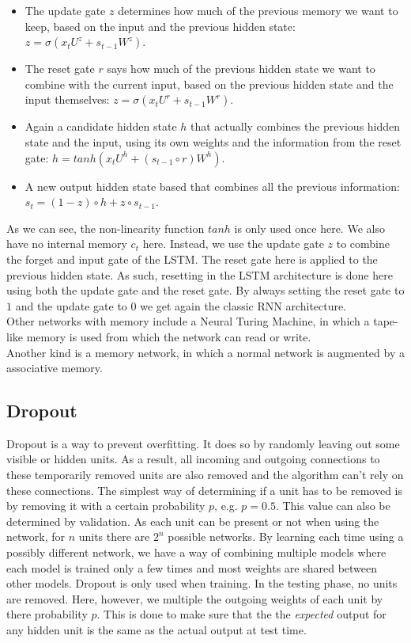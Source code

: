 \documentclass[a4paper]{article}
\begin{document}
\begin{itemize}
\item The update gate $z$ determines how much of the previous memory we want to keep, based on the input and the previous hidden state: $z = \sigma (x_tU^z + s_{t-1}W^z)$.
\item The reset gate $r$ says how much of the previous hidden state we want to combine with the current input, based on the previous hidden state and the input themselves: $z = \sigma (x_tU^r + s_{t-1}W^r)$.
\item Again a candidate hidden state $h$ that actually combines the previous hidden state and the input, using its own weights and the information from the reset gate: $h = tanh(x_tU^h + (s_{t-1} \circ r)W^h)$.
\item A new output hidden state based that combines all the previous information: $s_t = (1-z) \circ h + z \circ s_{t-1}$.
\end{itemize}
As we can see, the non-linearity function $tanh$ is only used once here. We also have no internal memory $c_t$ here. Instead, we use the update gate $z$ to combine the forget and input gate of the LSTM. The reset gate here is applied to the previous hidden state. As such, resetting in the LSTM architecture is done here using both the update gate and the reset gate. By always setting the reset gate to $1$ and the update gate to $0$ we get again the classic RNN architecture.\\

Other networks with memory include a Neural Turing Machine, in which a tape-like memory is used from which the network can read or write.\\
Another kind is a memory network, in which a normal network is augmented by a associative memory.\\

\subsection{Dropout}
Dropout is a way to prevent overfitting. It does so by randomly leaving out some visible or hidden units. As a result, all incoming and outgoing connections to these temporarily removed units are also removed and the algorithm can't rely on these connections. The simplest way of determining if a unit has to be removed is by removing it with a certain probability $p$, e.g. $p=0.5$. This value can also be determined by validation. As each unit can be present or not when using the network, for $n$ units there are $2^n$ possible networks. By learning each time using a possibly different network, we have a way of combining multiple models where each model is trained only a few times and most weights are shared between other models. Dropout is only used when training. In the testing phase, no units are removed. Here, however, we multiple the outgoing weights of each unit by there probability $p$.
This is done to make sure that the the \textit{expected} output for any hidden unit is the same as the actual output at test time.
\end{document}
